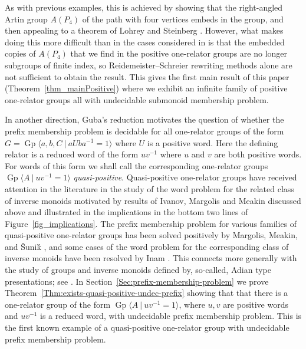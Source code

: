 \documentclass{amsart}
\newcommand{\Gpres}[2]{\operatorname{Gp}\bigl\langle #1\:|\:#2 \bigr\rangle}
\theoremstyle{plain}
\theoremstyle{definition}
\begin{document}
As with previous examples, this is achieved by  
showing that the right-angled Artin group $A(P_4)$ of the path with four vertices embeds in the group, and then appealing to a theorem of Lohrey and Steinberg \cite[Theorem~2]{Lohrey2008}.  
However, what makes doing this more difficult than in the cases considered in \cite{nyberg2022diophantine} is that the embedded copies of $A(P_4)$ that we find in the positive one-relator groups are no longer subgroups of finite index, so Reidemeister--Schreier rewriting methods alone are not sufficient to obtain the result.
This gives the first main result of this paper (Theorem~\ref{thm_mainPositive}) where we exhibit an infinite family of positive one-relator groups all with undecidable submonoid membership problem.  



In another direction, Guba's reduction motivates the question of whether the prefix membership problem is decidable for all one-relator groups of the form  $G = \Gpres{a,b,C}{aUba^{-1} = 1}$ where $U$ is a positive word. Here the defining relator is a reduced word of the form $uv^{-1}$ where $u$ and $v$ are both positive words. For words of this form we shall call the corresponding one-relator groups $\Gpres{A}{uv^{-1}=1}$ \emph{quasi-positive}. Quasi-positive one-relator groups have received attention in the literature in the study of the word problem for the related class of inverse monoids motivated by results of Ivanov, Margolis and Meakin \cite{Ivanov2001} discussed above and illustrated in the 
implications in the bottom two lines of Figure~\ref{fig_implications}. The prefix membership problem for various families of quasi-positive one-relator groups has been solved positively by Margolis, Meakin, and \v{S}uni\'{k} \cite[Corollary~2.6]{MMSunik2005}, and some cases of the word problem for the corresponding class of inverse monoids have been resolved by Inam \cite{Inam2017}. 
This connects more generally with the study of groups and inverse monoids defined by, so-called, Adian type presentations; see \cite{ Stallings1987, Inam2017b}.
In Section~\ref{Sec:prefix-membership-problem} we 
prove Theorem~\ref{Thm:exists-quasi-positive-undec-prefix} showing that that there is a one-relator group of the form $\Gpres{A}{uv^{-1}=1}$, where $u, v$ are positive words and $uv^{-1}$ is a reduced word, with undecidable prefix membership problem. 
This is the first known example of a quasi-positive one-relator group with undecidable prefix membership problem. 
\end{document}
